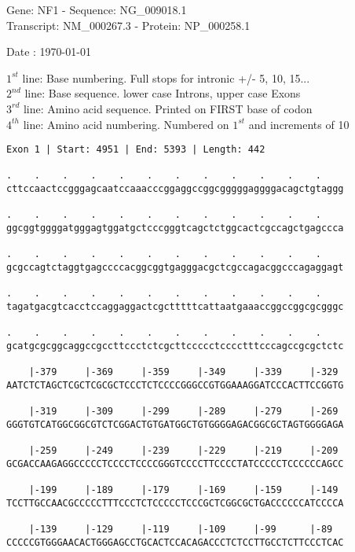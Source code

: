 \documentclass{article}
\begin{document}
\begin{center}
\begin{large}
Gene: NF1 - Sequence: NG\_009018.1\\
Transcript: NM\_000267.3 - Protein: NP\_000258.1
 
 Date : \today
\end{large}
\end{center}
$1^{st}$ line: Base numbering. Full stops for intronic +/- 5, 10, 15...\\
$2^{nd}$ line: Base sequence. lower case Introns, upper case Exons\\
$3^{rd}$ line: Amino acid sequence. Printed on FIRST base of codon\\
$4^{th}$ line: Amino acid numbering. Numbered on $1^{st}$ and increments of 10\\
\begin{Verbatim}
Exon 1 | Start: 4951 | End: 5393 | Length: 442
 
.    .    .    .    .    .    .    .    .    .    .    .    
cttccaactccgggagcaatccaaacccggaggccggcgggggaggggacagctgtaggg
  
.    .    .    .    .    .    .    .    .    .    .    .    
ggcggtggggatgggagtggatgctcccgggtcagctctggcactcgccagctgagccca
  
.    .    .    .    .    .    .    .    .    .    .    .    
gcgccagtctaggtgagccccacggcggtgagggacgctcgccagacggcccagaggagt
  
.    .    .    .    .    .    .    .    .    .    .    .    
tagatgacgtcacctccaggaggactcgctttttcattaatgaaaccggccggcgcgggc
  
.    .    .    .    .    .    .    .    .    .    .    .    
gcatgcgcggcaggccgccttccctctcgcttccccctcccctttcccagccgcgctctc
  
    |-379     |-369     |-359     |-349     |-339     |-329 
AATCTCTAGCTCGCTCGCGCTCCCTCTCCCCGGGCCGTGGAAAGGATCCCACTTCCGGTG
  
    |-319     |-309     |-299     |-289     |-279     |-269 
GGGTGTCATGGCGGCGTCTCGGACTGTGATGGCTGTGGGGAGACGGCGCTAGTGGGGAGA
  
    |-259     |-249     |-239     |-229     |-219     |-209 
GCGACCAAGAGGCCCCCTCCCCTCCCCGGGTCCCCTTCCCCTATCCCCCTCCCCCCAGCC
  
    |-199     |-189     |-179     |-169     |-159     |-149 
TCCTTGCCAACGCCCCCTTTCCCTCTCCCCCTCCCGCTCGGCGCTGACCCCCCATCCCCA
  
    |-139     |-129     |-119     |-109     |-99      |-89  
CCCCCGTGGGAACACTGGGAGCCTGCACTCCACAGACCCTCTCCTTGCCTCTTCCCTCAC
  

\end{Verbatim}
\end{document}
